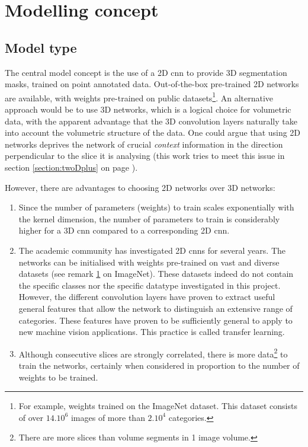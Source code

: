 \section{Modelling concept\label{sec:model_concept}}

\subsection{Model type}
\par{
    The central model concept is the use of a 2D \acrfull{cnn} to provide 3D segmentation masks, trained on point annotated data.
    Out-of-the-box pre-trained 2D networks are available, with weights pre-trained on public datasets\footnote{\label{footnote:Imagenet}For example, weights trained on the ImageNet dataset. 
    This dataset consists of over $14.10^6$ images of more than $2.10^4$ categories.}.
    An alternative approach would be to use 3D networks, which is a logical choice for volumetric data, with the apparent advantage that the 3D convolution layers naturally take into account the volumetric structure of the data.
    One could argue that using 2D networks deprives the network of crucial \textit{context} information in the direction perpendicular to the slice it is analysing (this work tries to meet this issue in section \ref{section:twoDplus} on page \pageref{section:twoDplus}).     
}

However, there are advantages to choosing 2D networks over 3D networks:
\begin{enumerate}
    \item Since the number of parameters (weights) to train scales exponentially with the kernel dimension, the number of parameters to train is considerably higher for a 3D \acrshort{cnn} compared to a corresponding 2D \acrshort{cnn}.
    \item The academic community has investigated 2D \acrlong{cnn}s for several years. The networks can be initialised with weights pre-trained on vast and diverse datasets (see remark \ref{footnote:Imagenet} on ImageNet). 
    These datasets indeed do not contain the specific classes nor the specific datatype investigated in this project. 
    However, the different convolution layers have proven to extract useful general features that allow the network to distinguish an extensive range of categories. 
    These features have proven to be sufficiently general to apply to new machine vision applications. This practice is called transfer learning.
    \item Although consecutive slices are strongly correlated, there is more data\footnote{There are more slices than volume segments in 1 image volume.} to train the networks, certainly when considered in proportion to the number of weights to be trained.
\end{enumerate}

